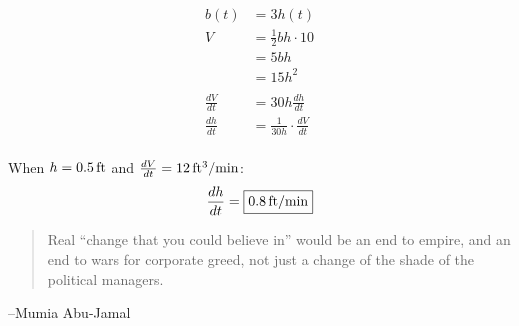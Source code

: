 \documentclass[letterpaper, landscape]{exam}
\begin{document}
\begin{description}
      \begin{align*}
        b(t) & = 3 h(t) \\
        V    & = \frac{1}{2} bh \cdot 10 \\
             & = 5bh \\
             & = 15 h^2 \\
        \\
        \frac{dV}{dt} &= 30 h \frac{dh}{dt} \\
        \frac{dh}{dt} &= \frac{1}{30 h} \cdot \frac{dV}{dt} \\
      \end{align*}

      When $h = \unit[0.5]{ft}$ and $\frac{dV}{dt} = \unit[12]{ft^3/min}$:
      \[
        \frac{dh}{dt} = \boxed{ \unit[0.8]{ft/min} }
      \]

  \end{description}

  \else
    \vspace{10 cm}
    \begin{quote}
      \begin{em}
        Real ``change that you could believe in'' would be an end to empire,
        and an end to wars for corporate greed, not just a change of the shade
        of the political managers.
      \end{em}
    \end{quote}
    \hspace{2 cm} --Mumia Abu-Jamal
  \fi
\end{document}
